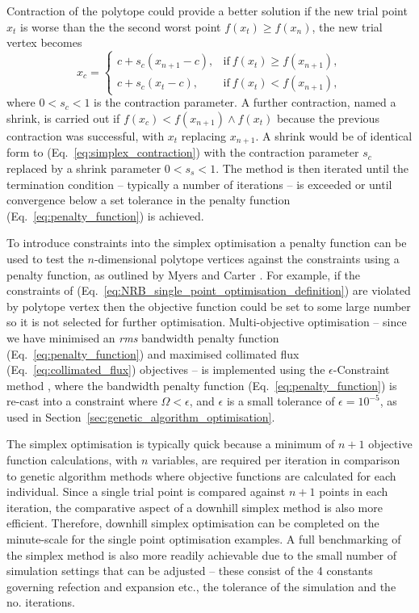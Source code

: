 \documentclass[../main.tex]{subfiles}
\begin{document}
Contraction of the polytope could provide a better solution if the new trial point $x_{t}$ is worse than the the second worst point $f\left(x_{t}\right) \geq f\left(x_{n}\right)$, the new trial vertex becomes
\begin{equation}
x_{c} = 
\begin{cases}
c+s_{c}\left(x_{n+1}-c\right), & \text{if}  ~f\left(x_{t}\right) \geq f\left(x_{n+1}\right), \\
c+s_{c}\left(x_{t}-c\right), & \text{if}  ~f\left(x_{t}\right) < f\left(x_{n+1}\right),
\end{cases}
\label{eq:simplex_contraction}
\end{equation}
where $0 < s_{c} < 1$ is the contraction parameter. A further contraction, named a shrink, is carried out if $f\left(x_{c}\right) < f\left(x_{n+1}\right) \land f\left(x_{t}\right)$ because the previous contraction was successful, with $x_{t}$ replacing $x_{n+1}$. A shrink would be of identical form to (Eq.~\ref{eq:simplex_contraction}) with the contraction parameter $s_{c}$ replaced by a shrink parameter $0 < s_{s} < 1$. The method is then iterated until the termination condition -- typically a number of iterations -- is exceeded or until convergence below a set tolerance in the penalty function (Eq.~\ref{eq:penalty_function}) is achieved. 

To introduce constraints into the simplex optimisation a penalty function can be used to test the $n$-dimensional polytope vertices against the constraints using a penalty function, as outlined by Myers and Carter \cite{myers1973response}. For example, if the constraints of (Eq.~\ref{eq:NRB_single_point_optimisation_definition}) are violated by polytope vertex then the objective function could be set to some large number so it is not selected for further optimisation. Multi-objective optimisation -- since we have minimised an \textit{rms} bandwidth penalty function (Eq.~\ref{eq:penalty_function}) and maximised collimated flux (Eq.~\ref{eq:collimated_flux}) objectives -- is implemented using the $\epsilon$-Constraint method \cite{marler2004survey}, where the bandwidth penalty function (Eq.~\ref{eq:penalty_function}) is re-cast into a constraint where $\Omega < \epsilon$, and $\epsilon$ is a small tolerance of $\epsilon = 10^{-5}$, as used in Section~\ref{sec:genetic_algorithm_optimisation}.  

The simplex optimisation is typically quick because a minimum of $n+1$  objective function calculations, with $n$ variables, are required per iteration in comparison to genetic algorithm methods where objective functions are calculated for each individual. Since a single trial point is compared against $n+1$ points in each iteration, the comparative aspect of a downhill simplex method is also more efficient. Therefore, downhill simplex optimisation can be completed on the minute-scale for the single point optimisation examples. A full benchmarking of the simplex method is also more readily achievable due to the small number of simulation settings that can be adjusted -- these consist of the 4 constants governing refection and expansion etc., the tolerance of the simulation and the no. iterations.   
\end{document}
